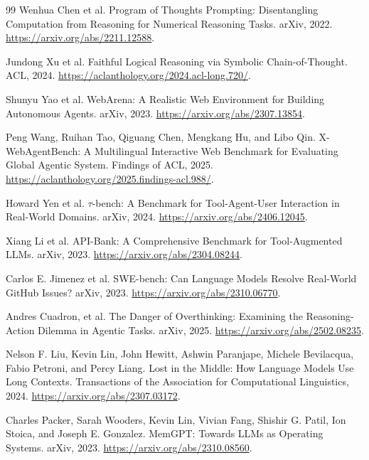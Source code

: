 \documentclass[11pt]{article}
\begin{document}
\begin{thebibliography}{99}
Wenhua Chen et al.
\newblock Program of Thoughts Prompting: Disentangling Computation from Reasoning for Numerical Reasoning Tasks.
\newblock arXiv, 2022.
\newblock \url{https://arxiv.org/abs/2211.12588}.

Jundong Xu et al.
\newblock Faithful Logical Reasoning via Symbolic Chain-of-Thought.
\newblock ACL, 2024.
\newblock \url{https://aclanthology.org/2024.acl-long.720/}.

Shunyu Yao et al.
\newblock WebArena: A Realistic Web Environment for Building Autonomous Agents.
\newblock arXiv, 2023.
\newblock \url{https://arxiv.org/abs/2307.13854}.

Peng Wang, Ruihan Tao, Qiguang Chen, Mengkang Hu, and Libo Qin.
\newblock X-WebAgentBench: A Multilingual Interactive Web Benchmark for Evaluating Global Agentic System.
\newblock Findings of ACL, 2025.
\newblock \url{https://aclanthology.org/2025.findings-acl.988/}.

Howard Yen et al.
\newblock $\tau$-bench: A Benchmark for Tool-Agent-User Interaction in Real-World Domains.
\newblock arXiv, 2024.
\newblock \url{https://arxiv.org/abs/2406.12045}.

Xiang Li et al.
\newblock API-Bank: A Comprehensive Benchmark for Tool-Augmented LLMs.
\newblock arXiv, 2023.
\newblock \url{https://arxiv.org/abs/2304.08244}.

Carlos E. Jimenez et al.
\newblock SWE-bench: Can Language Models Resolve Real-World GitHub Issues?
\newblock arXiv, 2023.
\newblock \url{https://arxiv.org/abs/2310.06770}.

Andres Cuadron, et al.
\newblock The Danger of Overthinking: Examining the Reasoning-Action Dilemma in Agentic Tasks.
\newblock arXiv, 2025.
\newblock \url{https://arxiv.org/abs/2502.08235}.

Nelson F. Liu, Kevin Lin, John Hewitt, Ashwin Paranjape, Michele Bevilacqua, Fabio Petroni, and Percy Liang.
\newblock Lost in the Middle: How Language Models Use Long Contexts.
\newblock Transactions of the Association for Computational Linguistics, 2024.
\newblock \url{https://arxiv.org/abs/2307.03172}.

Charles Packer, Sarah Wooders, Kevin Lin, Vivian Fang, Shishir G. Patil, Ion Stoica, and Joseph E. Gonzalez.
\newblock MemGPT: Towards LLMs as Operating Systems.
\newblock arXiv, 2023.
\newblock \url{https://arxiv.org/abs/2310.08560}.


\end{thebibliography}
\end{document}
